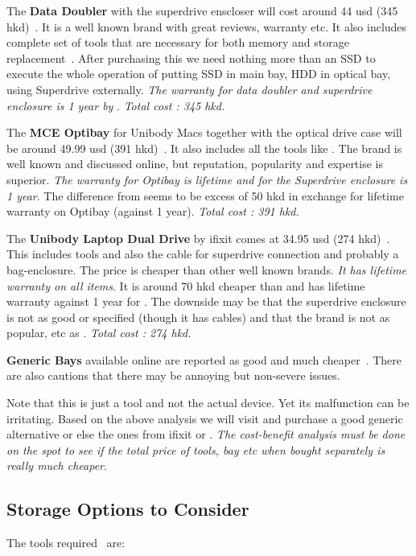 The \textbf{\macsales Data Doubler} with the superdrive enscloser will cost around 44 usd (345 hkd)~\cite{owcdoubsup}. It is a well known brand with great reviews, warranty etc. It also includes complete set of tools that are necessary for both memory and storage replacement~\cite{owcdoubtools}. After purchasing this we need nothing more than an SSD to execute the whole operation of putting SSD in main bay, HDD in optical bay, using Superdrive externally. \emph{The warranty for data doubler and superdrive enclosure is 1 year by \macsales}. 
\emph{Total cost : 345 hkd.}

The \textbf{MCE Optibay} for Unibody Macs together with the optical drive case will be around 49.99 usd (391 hkd)~\cite{mcetechoptibay, mcetechdriveen}. It also includes all the tools like \macsales. 
The brand is well known and discussed online, but \macsales reputation, popularity and expertise is superior.
\emph{The warranty for Optibay is lifetime and for the Superdrive enclosure is 1 year}.
The difference from \macsales seems to be excess of 50 hkd in exchange for lifetime warranty on Optibay (against 1 year). 
\emph{ Total cost : 391 hkd.}

The \textbf{Unibody Laptop Dual Drive} by ifixit comes at 34.95 usd (274 hkd)~\cite{ifixitdualdr}. This includes tools and also the cable for superdrive connection and probably a bag-enclosure. The price is cheaper than other well known brands. \emph{It has lifetime warranty on all items}. It is around 70 hkd cheaper than \macsales and has lifetime warranty against 1 year for \macsales. The downside may be that the superdrive enclosure is not as good or specified (though it has cables) and that the brand is not as popular, etc as \macsales.
\emph{ Total cost : 274 hkd.}

\textbf{Generic Bays} available online are reported as good and much cheaper~\cite{amaznbay,macrumoursbaydiss,cnetbaydiss,applestbaydiss}. There are also cautions that there may be annoying but non-severe issues. 

Note that this is just a tool and not the actual device. Yet its malfunction can be irritating. Based on the above analysis we will visit \market and purchase a good generic alternative or else the ones from ifixit or \macsales. \emph{ The cost-benefit analysis must be done on the spot to see if the total price of tools, bay etc when bought separately is really much cheaper}.

\subsection{Storage Options to Consider}
\label{storageOptions}
The tools required~\cite{ifixhdreguide} are:

